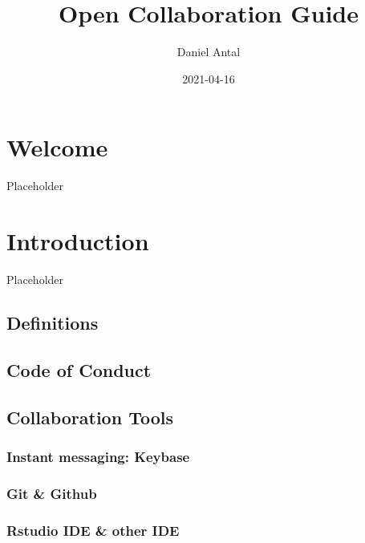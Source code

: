 \documentclass[
  fontsize=13pt,
  english,
  a4paper,
  openany, a4paper, oneside]{book}
\title{Open Collaboration Guide}
\author{Daniel Antal}
\date{2021-04-16}
\begin{document}
\maketitle

{
\hypersetup{linkcolor=}
\setcounter{tocdepth}{1}
\tableofcontents
}
\hypertarget{welcome}{%
\chapter*{Welcome}\label{welcome}}

Placeholder

\hypertarget{intro}{%
\chapter{Introduction}\label{intro}}

Placeholder

\hypertarget{definitions}{%
\section{Definitions}\label{definitions}}

\hypertarget{pledge}{%
\section{Code of Conduct}\label{pledge}}

\hypertarget{collaboration-tools}{%
\section{Collaboration Tools}\label{collaboration-tools}}

\hypertarget{keybase}{%
\subsection{Instant messaging: Keybase}\label{keybase}}

\hypertarget{github}{%
\subsection{Git \& Github}\label{github}}

\hypertarget{rstudio-ide-other-ide}{%
\subsection{Rstudio IDE \& other IDE}\label{rstudio-ide-other-ide}}
\end{document}
